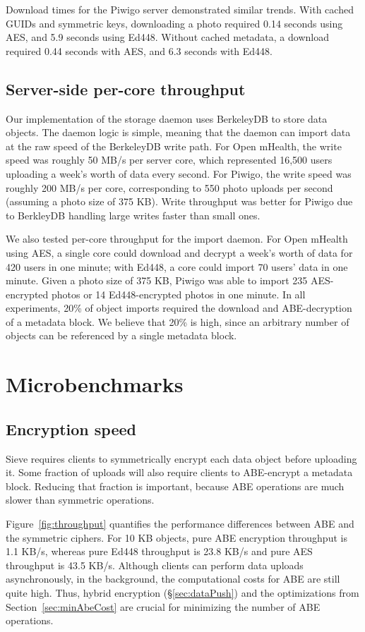 Download times for the Piwigo server demonstrated
similar trends. With cached GUIDs and symmetric
keys, downloading a photo required 0.14 seconds
using AES, and 5.9 seconds using Ed448. Without
cached metadata, a download required 0.44 seconds
with AES, and 6.3 seconds with Ed448.

\subsection{Server-side per-core throughput} 
Our implementation of the storage daemon uses BerkeleyDB
to store data objects. The daemon logic is simple,
meaning that the daemon can import data at the
raw speed of the BerkeleyDB write path. For Open
mHealth, the write speed was roughly 50 MB/s per
server core, which represented 16,500 users
uploading a week's worth of data every second.
For Piwigo, the write speed was roughly 200 MB/s
per core, corresponding to 550 photo uploads per
second (assuming a photo size of 375 KB). Write
throughput was better for Piwigo due to BerkleyDB
handling large writes faster than small ones.

We also tested per-core throughput for the
import daemon. For Open mHealth using AES,
a single core could download and decrypt a
week's worth of data for 420 users in one
minute; with Ed448, a core could import 70
users' data in one minute. Given a photo
size of 375 KB, Piwigo was able to import
235 AES-encrypted photos or 14 Ed448-encrypted
photos in one minute. In all experiments,
20\% of object imports required the download
and ABE-decryption of a metadata block. We
believe that 20\% is high, since an arbitrary
number of objects can be referenced by a
single metadata block. 

\section{Microbenchmarks}
\label{sec:microbench}
\subsection{Encryption speed} 
Sieve requires
clients to symmetrically encrypt each data
object before uploading it. Some fraction of
uploads will also require clients to
ABE-encrypt a metadata block. Reducing
that fraction is important, because ABE
operations are much slower than symmetric
operations.

Figure~\ref{fig:throughput} quantifies the
performance differences between ABE and
the symmetric ciphers. For 10 KB objects,
pure ABE encryption throughput is 1.1 KB/s,
whereas pure Ed448 throughput is 23.8 KB/s
and pure AES throughput is 43.5 KB/s.
Although clients can perform data uploads
asynchronously, in the background, the
computational costs for ABE are still quite
high. Thus, hybrid encryption (\S\ref{sec:dataPush})
and the optimizations from Section~\ref{sec:minAbeCost}
are crucial for minimizing the number of
ABE operations.

